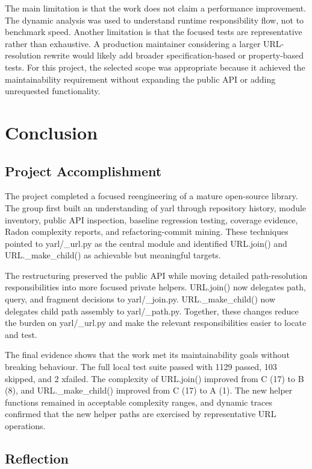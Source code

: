 \documentclass[11pt,a4paper]{article}
\begin{document}
The main limitation is that the work does not claim a performance improvement. The dynamic analysis was used to understand runtime responsibility flow, not to benchmark speed. Another limitation is that the focused tests are representative rather than exhaustive. A production maintainer considering a larger URL-resolution rewrite would likely add broader specification-based or property-based tests. For this project, the selected scope was appropriate because it achieved the maintainability requirement without expanding the public API or adding unrequested functionality.


\section*{Conclusion}


\subsection*{Project Accomplishment}


The project completed a focused reengineering of a mature open-source library. The group first built an understanding of yarl through repository history, module inventory, public API inspection, baseline regression testing, coverage evidence, Radon complexity reports, and refactoring-commit mining. These techniques pointed to yarl/\_url.py as the central module and identified URL.join() and URL.\_make\_child() as achievable but meaningful targets.


The restructuring preserved the public API while moving detailed path-resolution responsibilities into more focused private helpers. URL.join() now delegates path, query, and fragment decisions to yarl/\_join.py. URL.\_make\_child() now delegates child path assembly to yarl/\_path.py. Together, these changes reduce the burden on yarl/\_url.py and make the relevant responsibilities easier to locate and test.


The final evidence shows that the work met its maintainability goals without breaking behaviour. The full local test suite passed with 1129 passed, 103 skipped, and 2 xfailed. The complexity of URL.join() improved from C (17) to B (8), and URL.\_make\_child() improved from C (17) to A (1). The new helper functions remained in acceptable complexity ranges, and dynamic traces confirmed that the new helper paths are exercised by representative URL operations.


\subsection*{Reflection}
\end{document}
